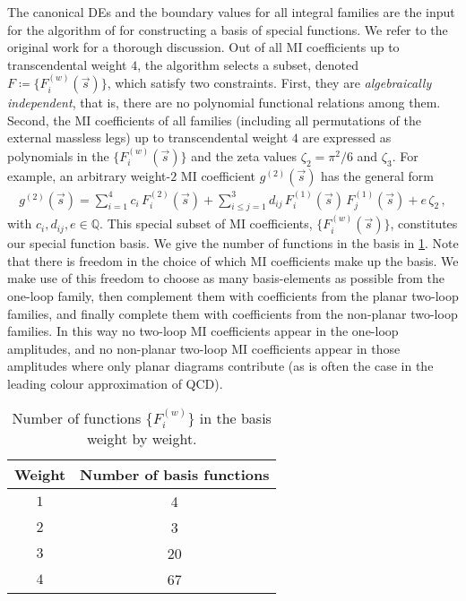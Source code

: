 \documentclass[main.tex]{subfiles}
\begin{document}
The canonical DEs  and the boundary values for all integral families are the input for the algorithm of  for constructing a basis of special functions. We refer to the original work for a thorough discussion. 
Out of all \ac{MI} coefficients up to transcendental weight $4$, the algorithm selects a subset, denoted $F \coloneqq \{F^{(w)}_i(\vec{s})\}$, which satisfy two constraints. 
First, they are \emph{algebraically independent}, that is, there are no polynomial functional relations among them. Second, the \ac{MI} coefficients of all families (including all permutations of the external massless legs) up to transcendental weight $4$ are expressed as polynomials in the $\{F^{(w)}_i(\vec{s})\}$ and the zeta values $\zeta_2 = \pi^2/6$ and $\zeta_3$. For example, an arbitrary weight-$2$ \ac{MI} coefficient $g^{(2)}(\vec{s})$ has the general form
\begin{align}
g^{(2)}(\vec{s}) = \sum_{i=1}^{4} c_i \, F_i^{(2)}(\vec{s}) + \sum_{i \le j =1}^{3} d_{ij} \, F_i^{(1)}(\vec{s}) \,  F_j^{(1)}(\vec{s}) + e \, \zeta_2 \,,
\end{align}
with $c_i, d_{ij}, e \in \mathbb{Q}$. This special subset of \ac{MI} coefficients, $\{F^{(w)}_i(\vec{s})\}$, constitutes our special function basis. 
We give the number of functions in the basis in \cref{tab:func_basis}. Note that there is freedom in the choice of which \ac{MI} coefficients make up the basis. We make use of this freedom to choose as many basis-elements as possible from the one-loop family, then complement them with coefficients from the planar two-loop families, and finally complete them with coefficients from the non-planar two-loop families. In this way no two-loop \ac{MI} coefficients appear in the one-loop amplitudes, and no non-planar two-loop \ac{MI} coefficients appear in those amplitudes where only planar diagrams contribute (as is often the case in the leading colour approximation of QCD).

\begin{table}
    \centering
    \begin{tabular}{cc}
        \hline
        Weight & Number of basis functions \\
        \hline
        $1$ & 4 \\
        $2$ & 3 \\
        $3$ & 20 \\
        $4$ & 67 \\
        \hline
    \end{tabular}
    \caption{Number of functions $\{F^{(w)}_i\}$ in the basis weight by weight.}
    \label{tab:func_basis}
\end{table}
\end{document}

